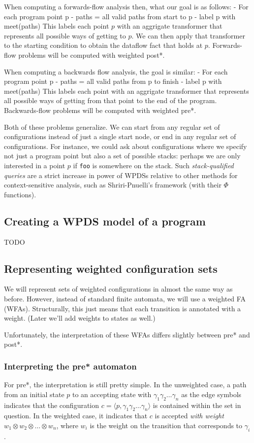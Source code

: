 \documentclass{article}
\newcommand{\Code}[1]{\texttt{#1}}
\newcommand{\Config}[2]{\ensuremath{\langle #1, #2 \rangle}}
\newcommand{\extend}{\otimes}
\begin{document}
When computing a forwards-flow analysis then, what our goal is as
follows:
    - For each program point p
        - paths = {all valid paths from start to p}
        - label p with meet(paths)
This labels each point $p$ with an aggrigate transformer that
represents all possible ways of getting to $p$. We can then apply that
transformer to the starting condition to obtain the dataflow fact that
holds at $p$. Forwards-flow problems will be computed with weighted
post*.

When computing a backwards flow analysis, the goal is similar:
    - For each program point p
        - paths = {all valid paths from p to finish}
        - label p with meet(paths)
This labels each point with an aggrigate transformer that represents
all possible ways of getting from that point to the end of the
program. Backwards-flow problems will be computed with weighted pre*.

Both of these problems generalize. We can start from any regular set
of configurations instead of just a single start node, or end in any
regular set of configurations. For instance, we could ask about
configurations where we specify not just a program point but also a
set of possible stacks: perhaps we are only interested in a point $p$
if \Code{foo} is somewhere on the stack.  Such \emph{stack-qualified
  queries} are a strict increase in power of WPDSs relative to other
methods for context-sensitive analysis, such as Shriri-Pnuelli's
framework (with their $\Phi$ functions).


\subsection{Creating a WPDS model of a program}

TODO


\subsection{Representing weighted configuration sets}

We will represent sets of weighted configurations in almost the same
way as before. However, instead of standard finite automata, we will
use a weighted FA (WFAs). Structurally, this just means that each
transition is annotated with a weight. (Later we'll add weights to
states as well.)

Unfortunately, the interpretation of these WFAs differs slightly
between pre* and post*.

\subsubsection{Interpreting the pre* automaton}
For pre*, the interpretation is still pretty simple. In the unweighted
case, a path from an initial state $p$ to an accepting state with
$\gamma_1\gamma_2\dots\gamma_n$ as the edge symbols indicates that the
configuration $c = \Config{p}{\gamma_1\gamma_2\dots\gamma_n}$ is
contained within the set in question. In the weighted case, it
indicates that $c$ is accepted \emph{with weight} $w_1 \extend w_2
\extend \dots \extend w_n$, where $w_i$ is the weight on the
transition that corresponds to $\gamma_i$.
\end{document}
